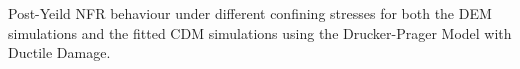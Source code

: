 \label{fig:fitted2} Post-Yeild NFR behaviour under different confining stresses for both the DEM simulations and the fitted CDM simulations using the Drucker-Prager Model with Ductile Damage.